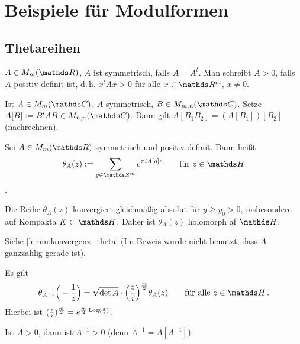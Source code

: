 \section{Beispiele für Modulformen}

\subsection{Thetareihen}

\begin{nota-list}
\item $A \in M_m(\RR)$, $A$ ist symmetrisch, falls $A = A^t$. Man schreibt $A > 0$, falls $A$ positiv definit ist, d.\,h. $x^tAx > 0$ für alle $x\in\RR^m$, $x\not=0$.
\item Ist $A \in M_m(\CC)$, $A$ symmetrisch, $B \in M_{m,n}(\CC)$. Setze $A[B] := B'AB \in M_{n,n}(\CC)$.
Dann gilt $A[B_1B_2] = (A[B_1])[B_2]$ (nachrechnen).
\end{nota-list}

\begin{defi}
Sei $A \in M_m(\RR)$ symmetrisch und positiv definit.
Dann heißt
\[
    \theta_A(z)
    := \sum_{g \in \ZZ^m} e^{\pi i A[g]z}
    \qquad \text{für } z \in \HH
\]
.
\end{defi}

\begin{lemm}
Die Reihe $\theta_A(z)$ konvergiert gleichmäßig absolut für $y \geq y_0 > 0$, insbesondere auf Kompakta $K \subset \HH$.
Daher ist $\theta_A(z)$ holomorph af $\HH$.
\end{lemm}

\begin{bewe}
Siehe \autoref{lemm:konvergenz_theta} (Im Beweis wurde nicht benutzt, dass $A$ ganzzahlig gerade ist).
\end{bewe}

\begin{satz}\label{satz:theta_trafo}
Es gilt
\[
    \theta_{A^{-1}}\Big(-\frac{1}{z}\Big)
    = \sqrt{\det A} \cdot \Big(\frac{z}{i}\Big)^{\frac{m}{2}} \theta_A(z)
    \qquad \text{für alle } z \in \HH
    \,.
\]
Hierbei ist $(\frac{z}{i})^{\frac{m}{2}} = e^{\frac{m}{2}\operatorname{Log}(\frac{z}{i})}$.
\end{satz}

\begin{beme}
Ist $A > 0$, dann ist $A^{-1} > 0$ (denn $A^{-1} = A[A^{-1}]$).
\end{beme}

